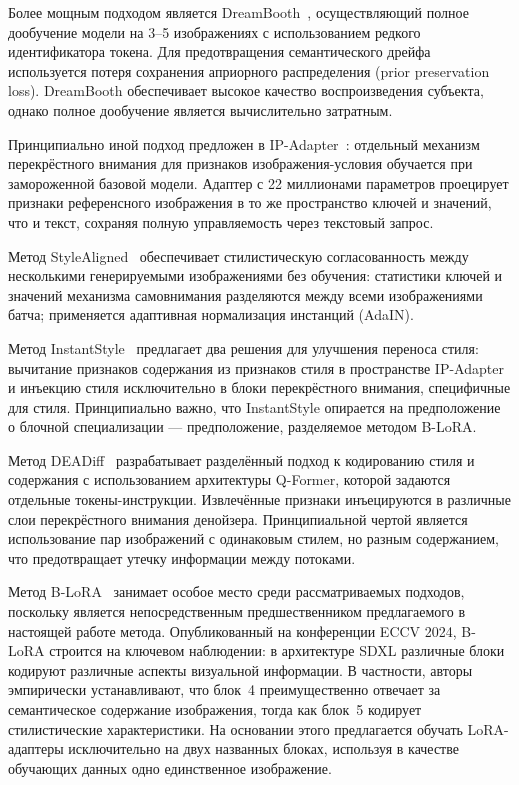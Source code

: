 Более мощным подходом является DreamBooth~\cite{ruiz2023dreambooth}, осуществляющий полное дообучение модели на 3--5 изображениях с использованием редкого идентификатора токена. Для предотвращения семантического дрейфа используется потеря сохранения априорного распределения (prior preservation loss). DreamBooth обеспечивает высокое качество воспроизведения субъекта, однако полное дообучение является вычислительно затратным.

Принципиально иной подход предложен в IP-Adapter~\cite{ye2023ipadapter}: отдельный механизм перекрёстного внимания для признаков изображения-условия обучается при замороженной базовой модели. Адаптер с 22 миллионами параметров проецирует признаки референсного изображения в то же пространство ключей и значений, что и текст, сохраняя полную управляемость через текстовый запрос.

Метод StyleAligned~\cite{hertz2024stylealigned} обеспечивает стилистическую согласованность между несколькими генерируемыми изображениями без обучения: статистики ключей и значений механизма самовнимания разделяются между всеми изображениями батча; применяется адаптивная нормализация инстанций (AdaIN).

Метод InstantStyle~\cite{wang2024instantstyle} предлагает два решения для улучшения переноса стиля: вычитание признаков содержания из признаков стиля в пространстве IP-Adapter и инъекцию стиля исключительно в блоки перекрёстного внимания, специфичные для стиля. Принципиально важно, что InstantStyle опирается на предположение о блочной специализации --- предположение, разделяемое методом B-LoRA.

Метод DEADiff~\cite{qi2024deadiff} разрабатывает разделённый подход к кодированию стиля и содержания с использованием архитектуры Q-Former, которой задаются отдельные токены-инструкции. Извлечённые признаки инъецируются в различные слои перекрёстного внимания денойзера. Принципиальной чертой является использование пар изображений с одинаковым стилем, но разным содержанием, что предотвращает утечку информации между потоками.

Метод B-LoRA~\cite{frenkel2024blora} занимает особое место среди рассматриваемых подходов, поскольку является непосредственным предшественником предлагаемого в настоящей работе метода. Опубликованный на конференции ECCV 2024, B-LoRA строится на ключевом наблюдении: в архитектуре SDXL различные блоки кодируют различные аспекты визуальной информации. В частности, авторы эмпирически устанавливают, что блок~4 преимущественно отвечает за семантическое содержание изображения, тогда как блок~5 кодирует стилистические характеристики. На основании этого предлагается обучать LoRA-адаптеры исключительно на двух названных блоках, используя в качестве обучающих данных одно единственное изображение.

